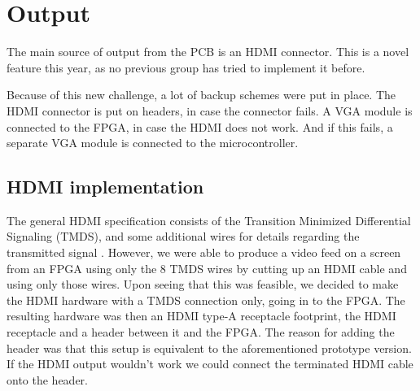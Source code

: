 \documentclass[../main/report.tex]{subfiles}
\begin{document}
\section{Output}
The main source of output from the PCB is an HDMI connector.
This is a novel feature this year, as no previous group has tried to implement it before.

Because of this new challenge, a lot of backup schemes were put in place.
The HDMI connector is put on headers, in case the connector fails.
A VGA module is connected to the FPGA, in case the HDMI does not work. And if this fails, a separate VGA module is connected to the microcontroller.

\subsection{HDMI implementation}

The general HDMI specification consists of the Transition Minimized Differential Signaling (TMDS),
and some additional wires for details regarding the transmitted signal \cite{hdmi-pinout}.
However, we were able to produce a video feed on a screen from an FPGA using only the 8 TMDS wires by cutting up an HDMI cable and using only those wires.
Upon seeing that this was feasible, we decided to make the HDMI hardware with a TMDS connection only, going in to the FPGA.
The resulting hardware was then an HDMI type-A receptacle footprint, the HDMI receptacle and a header between it and the FPGA.
The reason for adding the header was that this setup is equivalent to the aforementioned prototype version.
If the HDMI output wouldn't work we could connect the terminated HDMI cable onto the header.
\end{document}
